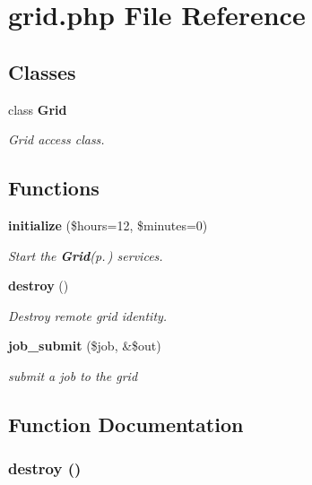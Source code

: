 \section{grid.php File Reference}
\label{grid_8php}
\subsection*{Classes}
\begin{CompactItemize}
\item 
class {\bf Grid}
\begin{CompactList}\small\item\em Grid access class. \item\end{CompactList}\end{CompactItemize}
\subsection*{Functions}
\begin{CompactItemize}
\item 
{\bf initialize} (\$hours=12, \$minutes=0)
\begin{CompactList}\small\item\em Start the {\bf Grid}{\rm (p.\,\pageref{classGrid})} services. \item\end{CompactList}\item 
{\bf destroy} ()
\begin{CompactList}\small\item\em Destroy remote grid identity. \item\end{CompactList}\item 
{\bf job\_\-submit} (\$job, \&\$out)
\begin{CompactList}\small\item\em submit a job to the grid \item\end{CompactList}\end{CompactItemize}


\subsection{Function Documentation}
\subsubsection{\setlength{\rightskip}{0pt plus 5cm}destroy ()}\label{grid_8php_a1}


